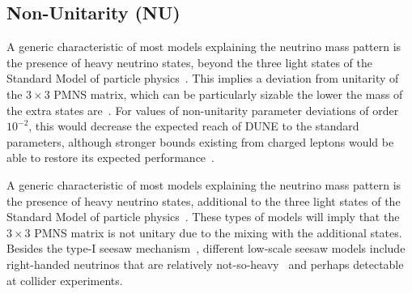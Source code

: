 \subsection{Non-Unitarity (NU)}
A generic characteristic of most models explaining the neutrino mass
pattern is the presence of heavy neutrino states, beyond the
three light states of the Standard Model of particle
physics~\cite{Minkowski:1977sc,Mohapatra:1979ia,Yanagida:1979as,GellMann:1980vs}. This implies a deviation from unitarity of the $3\times3$ PMNS matrix, which can be particularly sizable the lower the mass of the extra states are~\cite{Mohapatra:1986bd,Akhmedov:1995vm,Akhmedov:1995ip,Malinsky:2005bi}.
For values of non-unitarity parameter deviations of order $10^{-2}$, this would decrease the expected reach of DUNE to the standard parameters, although stronger bounds existing from charged leptons would be able to restore its expected performance~\cite{Blennow:2016jkn,Escrihuela:2016ube}.

A generic characteristic of most models explaining the neutrino mass
pattern is the presence of heavy neutrino states, additional to the
three light states of the Standard Model of particle
physics~\cite{Mohapatra:1998rq,Valle:2015pba,Fukugita:2003en}. These
types of models will imply that the $3\times3$ PMNS matrix is not
unitary due to the mixing with the additional states.  Besides the
type-I seesaw
mechanism~\cite{GellMann:1980vs,Yanagida:1979as,Mohapatra:1979ia,Schechter:1980gr},
different low-scale seesaw models include right-handed neutrinos that
are relatively not-so-heavy~\cite{Mohapatra:1986bd} and perhaps
detectable at collider experiments.

